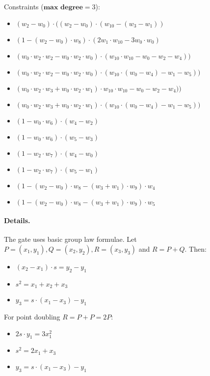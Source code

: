 Constraints ($\textbf{max degree} = 3$):
\begin{itemize}
\item $(w_2 - w_0)\cdot((w_2 - w_0)\cdot(w_{10}- (w_3 - w_1))$
\item $(1 - (w_2- w_0)\cdot w_8)\cdot (2w_1\cdot w_10 - 3w_0 \cdot w_0)$
\item $(w_0 \cdot w_2\cdot w_2 - w_0 \cdot w_2\cdot w_0) \cdot (w_{10} \cdot w_{10} - w_0 - w_2 - w_4))$
\item $(w_0 \cdot w_2 \cdot w_2 - w_0 \cdot w_2 \cdot w_0) \cdot (w_{10}\cdot (w_0- w_4) - w_1 - w_5))$
\item $(w_0 \cdot w_2\cdot w_3 + w_0 \cdot w_2\cdot w_1) \cdot w_{10} \cdot w_{10} - w_0 - w_2  - w_4))$
\item $ (w_0 \cdot w_2\cdot w_3 + w_0 \cdot w_2\cdot w_1) \cdot(w_{10} \cdot (w_0 - w_4) - w_1 - w_5))$
\item $(1 - w_0\cdot w_6)\cdot(w_4 -w_2)$
\item $(1 - w_0 \cdot w_6)\cdot(w_5 - w_3)$
\item $(1 - w_2 \cdot w_7)\cdot(w_4 - w_0)$
\item$ (1 - w_2 \cdot w_7)\cdot(w_5 - w_1)$
\item $(1 - (w_2 - w_0)\cdot w_8 - (w_3 + w_1)\cdot w_9) \cdot w_4$
\item $(1 - (w_2 - w_0)\cdot w_8 - (w_3 + w_1) \cdot w_9) \cdot w_5$
\end{itemize}

\paragraph{Details.}

The gate uses basic group law formulae. 
Let $P = (x_1, y_1), Q = (x_2, y_2), R = (x_3, y_3)$ and $R = P + Q$. Then: 
\begin{itemize}
    \item $(x_2 - x_1) \cdot s = y_2 - y_1$
    \item $s^2 = x_1 + x_2 + x_3$
    \item $y_3 = s \cdot (x_1 - x_3) - y_1$
\end{itemize}
For point doubling $R = P + P = 2P$:
\begin{itemize}
    \item $2s \cdot y_1 = 3x_1^2$
    \item $s^2 = 2x_1 + x_3$
    \item $y_3 = s \cdot (x_1 - x_3) - y_1$
\end{itemize}


